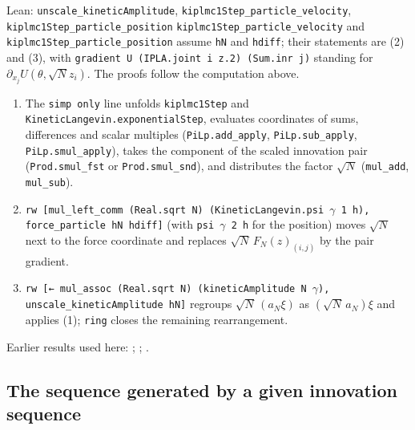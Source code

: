\documentclass[11pt,a4paper]{report}
\begin{document}
\begin{leanbox}{Lean: \texttt{unscale\_\allowbreak{}kineticAmplitude}, \texttt{kiplmc1Step\_\allowbreak{}particle\_\allowbreak{}velocity}, \texttt{kiplmc1Step\_\allowbreak{}particle\_\allowbreak{}position}}
\texttt{kiplmc1\allowbreak{}Step\_\allowbreak{}particle\_\allowbreak{}velocity} and \texttt{kiplmc1\allowbreak{}Step\_\allowbreak{}particle\_\allowbreak{}position} assume \texttt{h\allowbreak{}N} and \texttt{hdiff}; their statements are (2) and (3), with \texttt{gradient U (IPLA.\allowbreak{}joint i z.\allowbreak{}2) (Sum.\allowbreak{}inr j)} standing for \(\partial_{x_j}U(\theta,\sqrt Nz_i)\). The proofs follow the computation above.



\begin{enumerate}


\item The \texttt{simp only} line unfolds \texttt{kiplmc1\allowbreak{}Step} and \texttt{Kinetic\allowbreak{}Langevin.\allowbreak{}exponential\allowbreak{}Step}, evaluates coordinates of sums, differences and scalar multiples (\texttt{Pi\allowbreak{}Lp.\allowbreak{}add\_\allowbreak{}apply}, \texttt{Pi\allowbreak{}Lp.\allowbreak{}sub\_\allowbreak{}apply}, \texttt{Pi\allowbreak{}Lp.\allowbreak{}smul\_\allowbreak{}apply}), takes the component of the scaled innovation pair (\texttt{Prod.\allowbreak{}smul\_\allowbreak{}fst} or \texttt{Prod.\allowbreak{}smul\_\allowbreak{}snd}), and distributes the factor \(\sqrt N\) (\texttt{mul\_\allowbreak{}add}, \texttt{mul\_\allowbreak{}sub}).

\item \texttt{rw [mul\_\allowbreak{}left\_\allowbreak{}comm (Real.\allowbreak{}sqrt N) (Kinetic\allowbreak{}Langevin.\allowbreak{}psi \ensuremath{\gamma} 1 h), force\_\allowbreak{}particle h\allowbreak{}N hdiff]} (with \texttt{psi \ensuremath{\gamma} 2 h} for the position) moves \(\sqrt N\) next to the force coordinate and replaces \(\sqrt N\,F_N(z)_{(i,j)}\) by the pair gradient.

\item \texttt{rw [← mul\_\allowbreak{}assoc (Real.\allowbreak{}sqrt N) (kinetic\allowbreak{}Amplitude N \ensuremath{\gamma}), unscale\_\allowbreak{}kinetic\allowbreak{}Amplitude h\allowbreak{}N]} regroups \(\sqrt N\,(a_N\xi)\) as \((\sqrt N\,a_N)\xi\) and applies (1); \texttt{ring} closes the remaining rearrangement.

\end{enumerate}
\end{leanbox}


Earlier results used here: \cite[Section~3.1.1]{LangevinLean2026IPLA}; \cite[Section~3.10.1]{LangevinLean2026Kinetic}; \cite[Section~3.12.2]{LangevinLean2026Kinetic}.
\subsection{\texorpdfstring{The sequence generated by a given innovation sequence}{The sequence generated by a given innovation sequence}}
\label{report-step-KIPLMC-Exponential-lean-4}
\end{document}
